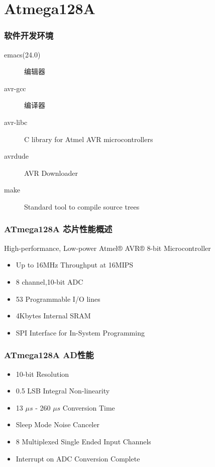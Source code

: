 \documentclass[bigger]{beamer}
\begin{document}
\section{Atmega128A}
\label{sec-3}
\begin{frame}
\frametitle{软件开发环境}
\label{sec-3-1}

\begin{description}
\item[emacs(24.0)] 编辑器
\item[avr-gcc] 编译器
\item[avr-libc] C library for Atmel AVR microcontrollers
\item[avrdude] AVR Downloader
\item[make] Standard tool to compile source trees
\end{description}
\end{frame}
\begin{frame}
\frametitle{ATmega128A 芯片性能概述}
\label{sec-3-2}

High-performance, Low-power Atmel® AVR® 8-bit Microcontroller
\begin{itemize}
\item Up to 16MHz Throughput at 16MIPS
\item 8 channel,10-bit ADC
\item 53 Programmable I/O lines
\item 4Kbytes Internal SRAM
\item SPI Interface for In-System Programming
\end{itemize}
\end{frame}
\begin{frame}
\frametitle{ATmega128A AD性能}
\label{sec-3-3}

\begin{itemize}
\item 10-bit Resolution
\item 0.5 LSB Integral Non-linearity
\item 13 $\mu{}s$ - 260 $\mu{}s$ Conversion Time
\item Sleep Mode Noise Canceler
\item 8 Multiplexed Single Ended Input Channels
\item Interrupt on ADC Conversion Complete
\end{itemize}
\end{frame}
\end{document}

